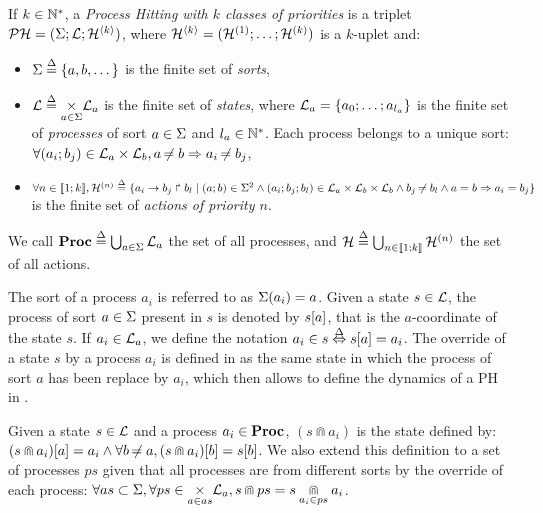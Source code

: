 \begin{definition}
\label{def:ph}
  If $k \in \mathbb{N}^*$, a \emph{Process Hitting with $k$ classes of priorities} is a triplet $\mathcal{PH} = (\Sigma; \mathcal{L}; \mathcal{H}^{\langle k \rangle})$,
  where $\mathcal{H}^{\langle k \rangle} = (\mathcal{H}^{(1)}; \dots; \mathcal{H}^{(k)})$ is a $k$-uplet and:
  \begin{itemize}
    \item $\Sigma \stackrel{\Delta}= \{a,b,\dots\}$ is the finite set of \emph{sorts},
    \item $\mathcal{L} \stackrel{\Delta}= \underset{a \in \Sigma}{\times} \mathcal{L}_a$ is the finite set of \emph{states}, where $\mathcal{L}_a = \{a_0 ; \ldots ; a_{l_a}\}$ is the finite set of \emph{processes} of sort $a \in \Sigma$ and $l_a \in \mathbb{N}^*$. Each process belongs to a unique sort: $\forall (a_i; b_j) \in \mathcal{L}_a \times \mathcal{L}_b, a \not\nobreak\mkern -2mu = b \Rightarrow a_i \not\nobreak\mkern -2mu = b_j$,
    \item $\forall n \in \llbracket 1; k \rrbracket, \mathcal{H}^{(n)} \stackrel{\Delta}= \{a_i\rightarrow b_j\Rsh b_l \mid (a; b) \in \Sigma^2 \wedge (a_i; b_j; b_l) \in \mathcal{L}_a \times \mathcal{L}_b \times \mathcal{L}_b \wedge b_j \not\nobreak\mkern -2mu = b_l \wedge a = b \Rightarrow a_i = b_j \}$ is the finite set of \emph{actions of priority $n$}.
  \end{itemize}
  We call $\mathbf{Proc} \stackrel{\Delta}= \bigcup_{a \in \Sigma} \mathcal{L}_a$ the set of all processes, and $\mathcal{H} \stackrel{\Delta}= \bigcup_{n \in \llbracket 1; k \rrbracket} \mathcal{H}^{(n)}$ the set of all actions.
\end{definition}
\noindent
The sort of a process $a_i$ is referred to as $\Sigma(a_i) = a$.
Given a state $s\in \mathcal{L}$, the process of sort $a \in \Sigma$ present in $s$ is denoted by ${s[a]}$, that is the $a$-coordinate of the state $s$.
If $a_i \in \mathcal{L}_a$, we define the notation $a_i \in s \stackrel{\Delta}\Leftrightarrow {s[a]} = a_i$.
The override of a state $s$ by a process $a_i$ is defined in  as the same state in which the process of sort $a$ has been replace by $a_i$,
which then allows to define the dynamics of a PH in .
\begin{definition}[$\Cap : \PHl \times \PHproc \rightarrow \PHl$]
\label{def:statecap}
  Given a state $s \in \mathcal{L}$ and a process $a_i \in \mathbf{Proc}$, $(s \Cap a_i)$ is the state defined by:
  ${(s \Cap a_i)[a]} = a_i \wedge \forall b \not\nobreak\mkern -2mu = a, {(s \Cap a_i)[b]} = {s[b]}$.
  We also extend this definition to a set of processes $ps$ given that all processes are from different sorts by the override of each process:
  $\forall as \subset \Sigma, \forall ps \in \underset{a \in as}{\times} \mathcal{L}_a, s \Cap ps = s \underset{a_i \in ps}{\Cap} a_i$.
\end{definition}
